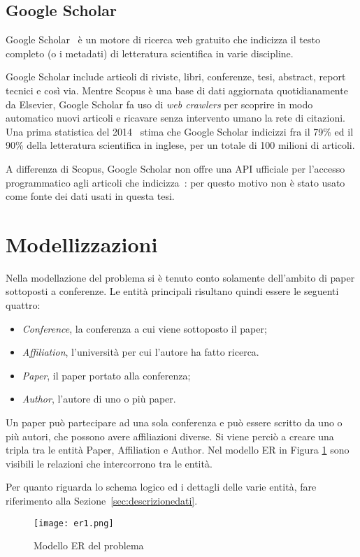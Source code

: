 \subsection{Google Scholar}\label{sec:google-scholar}

Google Scholar~\cite{scholar} è un motore di ricerca web gratuito che indicizza il testo
completo (o i metadati) di letteratura scientifica in varie discipline.

Google Scholar include articoli di riviste, libri, conferenze, tesi, abstract,
report tecnici e così via.
Mentre Scopus è una base di dati aggiornata quotidianamente da Elsevier, Google
Scholar fa uso di \textit{web crawlers} per scoprire in modo automatico nuovi
articoli e ricavare senza intervento umano la rete di citazioni.
Una prima statistica del 2014~\cite{khabsa2014} stima che Google Scholar
indicizzi fra il 79\% ed il 90\% della letteratura scientifica in inglese,
per un totale di 100 milioni di articoli.

A differenza di Scopus, Google Scholar non offre una API ufficiale per l'accesso
programmatico agli articoli che indicizza~\cite{stackoverflowScholarAPI}: per
questo motivo non è stato usato come fonte dei dati usati in questa tesi.

\section{Modellizzazioni}\label{sec:modellizzazioni}

Nella modellazione del problema si è tenuto conto solamente dell'ambito di
paper sottoposti a conferenze. Le entità principali risultano quindi essere
le seguenti quattro:

\begin{itemize}
    \item \textit{Conference}, la conferenza a cui viene sottoposto il paper;
    \item \textit{Affiliation}, l'università per cui l'autore ha fatto ricerca. 
    \item \textit{Paper}, il paper portato alla conferenza;
    \item \textit{Author}, l'autore di uno o più paper. 
\end{itemize}

Un paper può partecipare ad una sola conferenza e può essere scritto da uno o
più autori, che possono avere affiliazioni diverse. Si viene perciò a
creare una tripla tra le entità Paper, Affiliation e Author.
Nel modello ER in Figura \ref{fig:er1} sono visibili le relazioni che
intercorrono tra le entità.

Per quanto riguarda lo schema logico ed i dettagli delle varie entità,
fare riferimento alla Sezione~\ref{sec:descrizionedati}.

\begin{figure}
    \centering
    \texttt{[image: er1.png]}
    \caption{Modello ER del problema}
    \label{fig:er1}
\end{figure}
